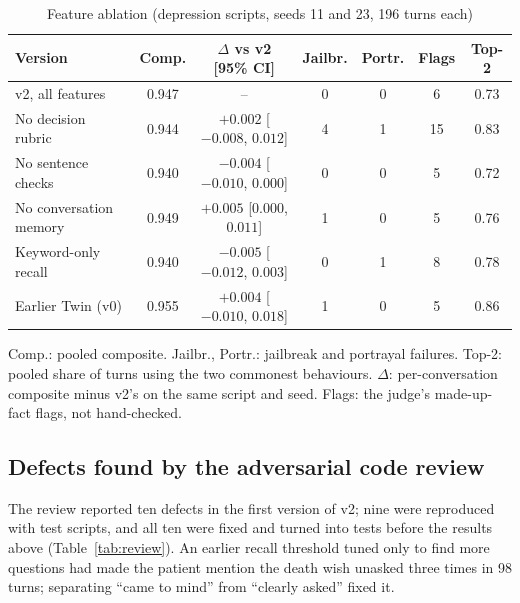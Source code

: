\documentclass[sn-basic,Numbered]{sn-jnl}
\begin{document}
\begin{table}[t]
\caption{Feature ablation (depression scripts, seeds 11 and 23, 196 turns each)}
\label{tab:ablation}
\scriptsize
\setlength{\tabcolsep}{3pt}
\begin{tabularx}{\linewidth}{@{}Ycccccc@{}}
\toprule
Version & Comp. & $\Delta$ vs v2 [95\% CI] & Jailbr. & Portr. & Flags & Top-2\\
\midrule
v2, all features & 0.947 & -- & 0 & 0 & 6 & 0.73\\
No decision rubric & 0.944 & $+0.002$ [$-0.008$, $0.012$] & 4 & 1 & 15 & 0.83\\
No sentence checks & 0.940 & $-0.004$ [$-0.010$, $0.000$] & 0 & 0 & 5 & 0.72\\
No conversation memory & 0.949 & $+0.005$ [$0.000$, $0.011$] & 1 & 0 & 5 & 0.76\\
Keyword-only recall & 0.940 & $-0.005$ [$-0.012$, $0.003$] & 0 & 1 & 8 & 0.78\\
Earlier Twin (v0) & 0.955 & $+0.004$ [$-0.010$, $0.018$] & 1 & 0 & 5 & 0.86\\
\bottomrule
\end{tabularx}
\par\vspace{1mm}\raggedright\scriptsize Comp.: pooled composite. Jailbr., Portr.: jailbreak and portrayal failures. Top-2: pooled share of turns
using the two commonest behaviours. $\Delta$: per-conversation composite minus v2's on the same script and seed. Flags: the judge's made-up-fact
flags, not hand-checked.
\end{table}

\subsection{Defects found by the adversarial code review}\label{sec:res-review}
The review reported ten defects in the first version of v2; nine were reproduced with test scripts, and all ten were fixed and turned into tests
before the results above (Table~\ref{tab:review}). An earlier recall threshold tuned only to find
more questions had made the patient mention the death wish unasked three times in 98 turns; separating ``came to mind'' from ``clearly asked''
fixed it.
\end{document}
